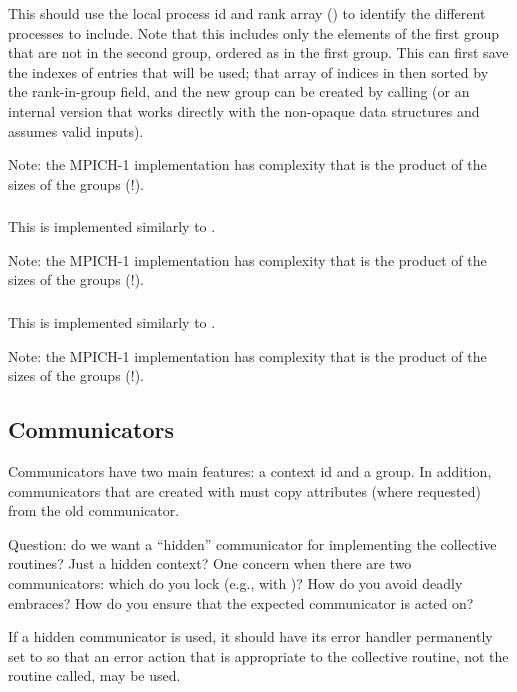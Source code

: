 \documentclass{article}
\begin{document}
This should use the local process id and rank array
() to identify the different
processes to include.  Note that this includes only the elements of the first
group that are not in the second group, ordered as in the first group.  
This can first save the indexes of entries that will be used; that array of
indices in then sorted by the rank-in-group field, and the new group can be
created by calling  (or an internal version that works
directly with the non-opaque data structures and assumes valid inputs).

Note: the MPICH-1 implementation has complexity that is the product of the
sizes of the groups (!).

\subsubsection{}

This is implemented similarly to .

Note: the MPICH-1 implementation has complexity that is the product of the
sizes of the groups (!).

\subsubsection{}

This is implemented similarly to .

Note: the MPICH-1 implementation has complexity that is the product of the
sizes of the groups (!).

\subsection{Communicators}
\label{sec:communicators}

Communicators have two main features: a context id and a group.  In
addition, communicators that are created with  must
copy attributes (where requested) from the old communicator.

Question: do we want a ``hidden'' communicator for implementing the
collective routines?  Just a hidden context?  One concern when there
are two communicators: which do you lock (e.g., with
)?  How do you avoid deadly embraces?  How do
you 
ensure that the expected communicator is acted on?

If a hidden communicator is used, it should have its error handler permanently
set to  so that an error action that is
appropriate to 
the collective routine, not the routine called, may be used.
\end{document}

